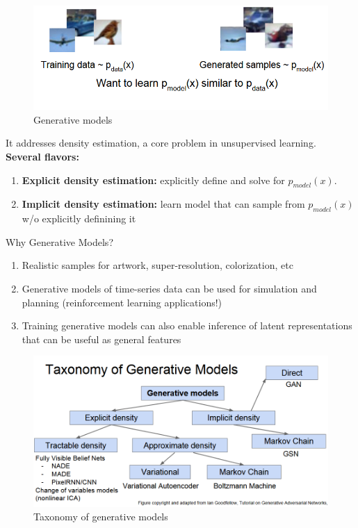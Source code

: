 \documentclass[11pt]{article}
\begin{document}
\begin{figure}[h]
\centering
\captionsetup{justification=centering}
\includegraphics[width=0.6\linewidth]{L1210.pdf}
\caption{ Generative models}
\label{fig:L1210}
\end{figure}
It addresses density estimation, a core problem in unsupervised learning.\\
\textbf{Several flavors:}
\begin{enumerate}
    \item \textbf{Explicit density estimation:} explicitly define and solve for $p_{model}(x)$.
    \item \textbf{Implicit density estimation:} learn model that can sample from $p_{model}(x)$ w/o explicitly definining it
\end{enumerate}{}
Why Generative Models?
\begin{enumerate}
    \item Realistic samples for artwork, super-resolution, colorization, etc
    \item Generative models of time-series data can be used for simulation and planning (reinforcement learning applications!)
    \item Training generative models can also enable inference of  latent representations that can be useful as general features
\end{enumerate}{}

\begin{figure}[h]
\centering
\captionsetup{justification=centering}
\includegraphics[width=0.7\linewidth]{L1211.pdf}
\caption{ Taxonomy of generative models}
\label{fig:L1211}
\end{figure}
\end{document}
